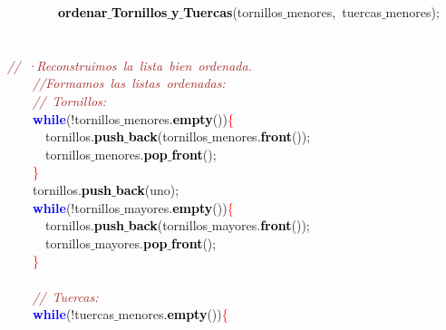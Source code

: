 \mbox{}\ \ \ \ \ \ \ \ \textbf{\textcolor{Black}{ordenar$\_$Tornillos$\_$y$\_$Tuercas}}\textcolor{BrickRed}{(}tornillos$\_$menores\textcolor{BrickRed}{,}\ tuercas$\_$menores\textcolor{BrickRed}{);} \\
\mbox{} \\
\mbox{} \\
\mbox{}\textit{\textcolor{Brown}{//\ ·Reconstruimos\ la\ lista\ bien\ ordenada.}} \\
\mbox{}\ \ \ \ \textit{\textcolor{Brown}{//Formamos\ las\ listas\ ordenadas:}} \\
\mbox{}\ \ \ \ \textit{\textcolor{Brown}{//\ Tornillos:}} \\
\mbox{}\ \ \ \ \textbf{\textcolor{Blue}{while}}\textcolor{BrickRed}{(!}tornillos$\_$menores\textcolor{BrickRed}{.}\textbf{\textcolor{Black}{empty}}\textcolor{BrickRed}{())}\textcolor{Red}{\{} \\
\mbox{}\ \ \ \ \ \ tornillos\textcolor{BrickRed}{.}\textbf{\textcolor{Black}{push$\_$back}}\textcolor{BrickRed}{(}tornillos$\_$menores\textcolor{BrickRed}{.}\textbf{\textcolor{Black}{front}}\textcolor{BrickRed}{());} \\
\mbox{}\ \ \ \ \ \ tornillos$\_$menores\textcolor{BrickRed}{.}\textbf{\textcolor{Black}{pop$\_$front}}\textcolor{BrickRed}{();} \\
\mbox{}\ \ \ \ \textcolor{Red}{\}} \\
\mbox{}\ \ \ \ tornillos\textcolor{BrickRed}{.}\textbf{\textcolor{Black}{push$\_$back}}\textcolor{BrickRed}{(}uno\textcolor{BrickRed}{);} \\
\mbox{}\ \ \ \ \textbf{\textcolor{Blue}{while}}\textcolor{BrickRed}{(!}tornillos$\_$mayores\textcolor{BrickRed}{.}\textbf{\textcolor{Black}{empty}}\textcolor{BrickRed}{())}\textcolor{Red}{\{} \\
\mbox{}\ \ \ \ \ \ tornillos\textcolor{BrickRed}{.}\textbf{\textcolor{Black}{push$\_$back}}\textcolor{BrickRed}{(}tornillos$\_$mayores\textcolor{BrickRed}{.}\textbf{\textcolor{Black}{front}}\textcolor{BrickRed}{());} \\
\mbox{}\ \ \ \ \ \ tornillos$\_$mayores\textcolor{BrickRed}{.}\textbf{\textcolor{Black}{pop$\_$front}}\textcolor{BrickRed}{();} \\
\mbox{}\ \ \ \ \textcolor{Red}{\}} \\
\mbox{} \\
\mbox{}\ \ \ \ \textit{\textcolor{Brown}{//\ Tuercas:}} \\
\mbox{}\ \ \ \ \textbf{\textcolor{Blue}{while}}\textcolor{BrickRed}{(!}tuercas$\_$menores\textcolor{BrickRed}{.}\textbf{\textcolor{Black}{empty}}\textcolor{BrickRed}{())}\textcolor{Red}{\{} \\
